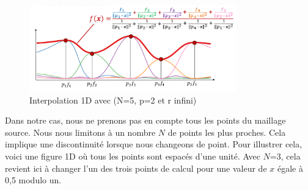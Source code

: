 
\vspace{0.5cm}

\begin{figure}[H]
    \centering
    \includegraphics[width=0.8\textwidth]{images/Inverse_Distance_Weighting.png}
    \caption{Interpolation 1D avec (N=5, p=2 et r infini)}
\end{figure}

\newpage

Dans notre cas, nous ne prenons pas en compte tous les points du maillage source. Nous nous limitons à un nombre \(N\) de points les plus proches. Cela implique une discontinuité lorsque nous changeons de point. Pour illustrer cela, voici une figure 1D où tous les points sont espacés d'une unité. Avec \(N\)=3, cela revient ici à changer l'un des trois points de calcul pour une valeur de \(x\) égale à 0,5 modulo un.


